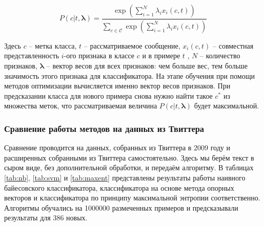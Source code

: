 \begin{equation}
P(c|t,\mathbf{\lambda}) = \frac{\exp\left (\sum\limits_{i=1}^N\lambda_ix_i(c,t)\right )}
{\sum\limits_{c\in\mathcal{C}} \exp\left (\sum\limits_{i=1}^N\lambda_ix_i(c,t)\right )}
\end{equation}

Здесь $c$ -- метка класса, $t$ -- рассматриваемое сообщение, $x_i(c,t)$ -- совместная
представленность $i$-ого признака в классе $c$ и в примере $t$ , $N$ --
количество признаков, $\mathbf{\lambda}$ -- вектор весов для всех
признаков: чем больше вес, тем больше значимость этого признака для классификатора. На этапе обучения
при помощи методов оптимизации вычисляется именно вектор весов признаков. При предсказании класса
для нового примера снова нужно найти такое $c^*$ из множества меток, что рассматриваемая величина $P(c|t,\mathbf{\lambda})$ будет максимальной.

\subsubsection{Сравнение работы методов на данных из Твиттера}\label{comparemeth}

Сравнение проводится на данных, собранных из Твиттера в 2009 году
\cite{go2009twitter} и расширенных собранными из Твиттера самостоятельно. Здесь мы берём текст в сыром виде, без дополнительной обработки, и передаём
алгоритму. В таблицах \ref{tab:nb}, \ref{tab:svm} и \ref{tab:maxent} представлены результаты работы
наивного байесовского классификатора, классификатора на основе метода опорных векторов и
классификатора по принципу максимальной энтропии соответственно. Алгоритмы обучались на 1000000
размеченных примеров и предсказывали результаты для 386 новых.

